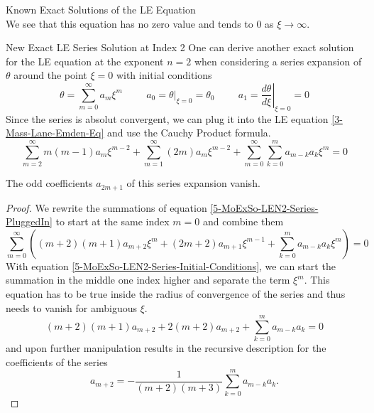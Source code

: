 \begin{appendix}
\begin{section}
\begin{subsection}{Known Exact Solutions of the LE Equation}
\begin{equation}
\end{equation}
We see that this equation has no zero value and tends to $0$ as $\xi\rightarrow\infty$.
\end{subsection}
%
%
\begin{subsection}{New Exact LE Series Solution at Index 2}
One can derive another exact solution for the LE equation at the exponent $n=2$ when 
considering a series expansion of $\theta$ around the point $\xi=0$ with initial conditions
\begin{equation}
	\theta=\sum\limits_{m=0}^\infty a_m\xi^m \hspace{1cm} a_0=\left.\theta\right|_{\xi=0}=\theta_0 
	\hspace{1cm} a_1=\left.\frac{d\theta}{d\xi}\right|_{\xi=0}=0
	\label{5-MoExSo-LEN2-Series-Initial-Conditions}
\end{equation}
Since the series is absolut convergent, we can plug it into the LE equation 
\ref{3-Mass-Lane-Emden-Eq} and use the Cauchy Product formula.
\begin{equation}
	\sum\limits_{m=2}^\infty m(m-1)a_m\xi^{m-2}+\sum\limits_{m=1}^\infty (2m)a_m\xi^{m-2} + 
	\sum\limits_{m=0}^\infty\sum\limits_{k=0}^m a_{m-k}a_k\xi^m = 0
	\label{5-MoExSo-LEN2-Series-PluggedIn}
\end{equation}
\begin{theorem}
	The odd coefficients $a_{2m+1}$ of this series expansion vanish.
\end{theorem}
\begin{proof}
	We rewrite the summations of equation \ref{5-MoExSo-LEN2-Series-PluggedIn} to start at the 
	same index $m=0$ and combine them
	\begin{equation}
		\sum\limits_{m=0}^\infty\left((m+2)(m+1)a_{m+2}\xi^{m}+(2m+2)a_{m+1}\xi^{m-1} + 
		\sum\limits_{k=0}^m a_{m-k}a_k\xi^m\right) = 0
	\end{equation}
	With equation \ref{5-MoExSo-LEN2-Series-Initial-Conditions}, we can start the summation 
	in the middle one index higher and separate the term $\xi^m$. This equation has to be true 
	inside the radius of convergence of the series and thus needs to vanish for ambiguous $\xi$.
	\begin{equation}
		(m+2)(m+1)a_{m+2}+2(m+2)a_{m+2}+\sum\limits_{k=0}^ma_{m-k}a_k = 0
	\end{equation}
	and upon further manipulation results in the recursive description for the coefficients 
	of the series
	\begin{equation}
		a_{m+2} = -\frac{1}{(m+2)(m+3)}\sum\limits_{k=0}^ma_{m-k}a_k.

\end{equation}
\end{proof}
\end{subsection}
\end{section}
\end{appendix}
